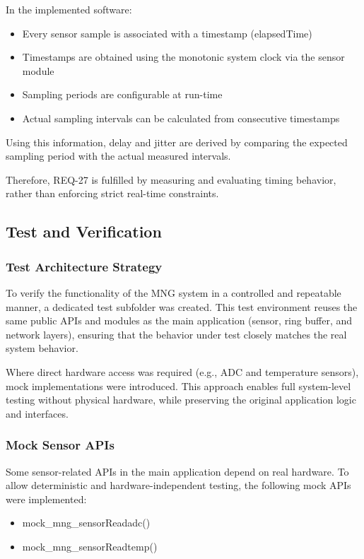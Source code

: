 \documentclass{article}
\begin{document}
In the implemented software:
\begin{itemize}
    \item Every sensor sample is associated with a timestamp (elapsedTime)
    \item Timestamps are obtained using the monotonic system clock via the sensor module
    \item Sampling periods are configurable at run-time
    \item Actual sampling intervals can be calculated from consecutive timestamps
\end{itemize}









Using this information, delay and jitter are derived by comparing the expected sampling period with the actual measured intervals.

Therefore, REQ-27 is fulfilled by measuring and evaluating timing behavior, rather than enforcing strict real-time constraints.

\newpage
\subsection{Test and Verification}

\subsubsection{Test Architecture Strategy}
To verify the functionality of the MNG system in a controlled and repeatable 
manner, a dedicated test subfolder was created. This test environment reuses the 
same public APIs and modules as the main application (sensor, ring buffer, and 
network layers), ensuring that the behavior under test closely matches the real 
system behavior.

Where direct hardware access was required (e.g., ADC and temperature sensors), 
mock implementations were introduced. This approach enables full system-level 
testing without physical hardware, while preserving the original application logic 
and interfaces.


\subsubsection{Mock Sensor APIs}

Some sensor-related APIs in the main application depend on real hardware. To allow 
deterministic and hardware-independent testing, the following mock APIs were 
implemented:
\begin{itemize}
    \item mock\_mng\_sensorReadadc()
    \item mock\_mng\_sensorReadtemp()
\end{itemize}
\end{document}
